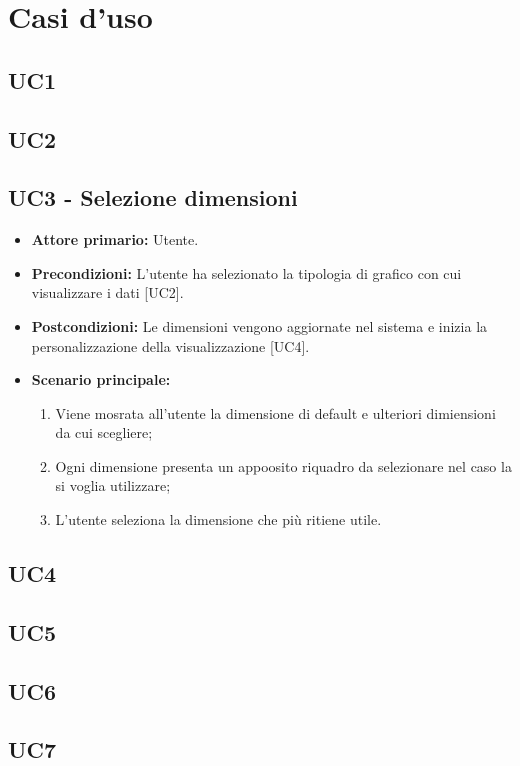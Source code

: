 \chapter{Casi d'uso}

\section{UC1}

\section{UC2}

\section{UC3 - Selezione dimensioni}
 \begin{itemize}
     \item \textbf{Attore primario:} Utente.
     \item \textbf{Precondizioni:} L'utente ha selezionato la tipologia di grafico con cui visualizzare i dati [UC2].
     \item \textbf{Postcondizioni:} Le dimensioni vengono aggiornate nel sistema e inizia la personalizzazione della visualizzazione [UC4].
     \item \textbf{Scenario principale:}
     \begin{enumerate}
         \item Viene mosrata all'utente la dimensione di default e ulteriori dimiensioni da cui scegliere;
         \item Ogni dimensione presenta un appoosito riquadro da selezionare nel caso la si voglia utilizzare;
         \item L'utente seleziona la dimensione che più ritiene utile.
     \end{enumerate}
 \end{itemize}

\section{UC4}

\section{UC5}

\section{UC6}

\section{UC7}